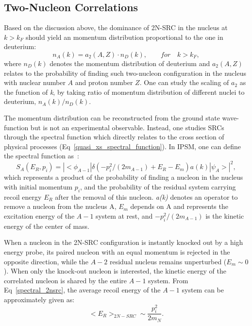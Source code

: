 \subsection{Two-Nucleon Correlations}
Based on the discussion above, the dominance of 2N-SRC in the nucleus at $k>k_{F}$ should yield an momentum distribution proportional to the one in deuterium:
\begin{equation}
  n_{A}(k) = a_{2}(A,Z)\cdot n_{D}(k), \qquad for\quad k>k_{F},
  \label{2nsrc_mon_scaling}
\end{equation}   
where $n_{D}(k)$ denotes the momentum distribution of deuterium and $a_{2}(A,Z)$ relates to the probability of finding such two-nucleon configuration in the nucleus with nuclear number $A$ and proton number $Z$. One can study the scaling of $a_{2}$ as the function of \emph{k}, by taking ratio of momentum distribution of different nuclei to deuterium, $n_{A}(k)/n_{D}(k)$.

The momentum distribution can be reconstructed from the ground state wave-function but is not an experimental observable. Instead, one studies SRCs through the spectral function which directly relates to the cross section of physical processes (Eq~\ref{quasi_xs_spectral_function}). In IPSM, one can define the spectral function as~\cite{Frankfurt_misak}:
\begin{equation}
  S_{A}(E_{R},p_{i}) = |<\phi_{A-1}|\delta(-p_{i}^{2}/(2m_{A-1}) + E_{R}-E_{m})a(k)|\psi_{A}>|^{2}, 
  \label{spectral_2nsrc}
\end{equation}
which represents a product of the probability of finding a nucleon in the nucleus with initial momentum $p_{i}$, and the probability of the residual system carrying recoil energy $E_{R}$ after the removal of this nucleon. \emph{a(k)} denotes an operator to remove a nucleon from the nucleus A, $E_{m}$ depends on A and represents the excitation energy of the $A-1$ system at rest, and $-p_{i}^{2}/(2m_{A-1})$ is the kinetic energy of the center of mass. 

When a nucleon in the 2N-SRC configuration is instantly knocked out by a high energy probe, its paired nucleon with an equal momentum is rejected in the opposite direction, while the $A-2$ residual nucleus remains unperturbed ($E_{m}\sim 0$). When only the knock-out nucleon is interested, the kinetic energy of the correlated nucleon is shared by the entire $A-1$ system. From Eq~\eqref{spectral_2nsrc}, the average recoil energy of the $A-1$ system can be approximately given as:
\begin{equation}
  <E_{R}>_{2N-SRC} \sim \frac{p^{2}_{i}}{2m_{N}}.
  \label{Er_2nsrc}
\end{equation}

